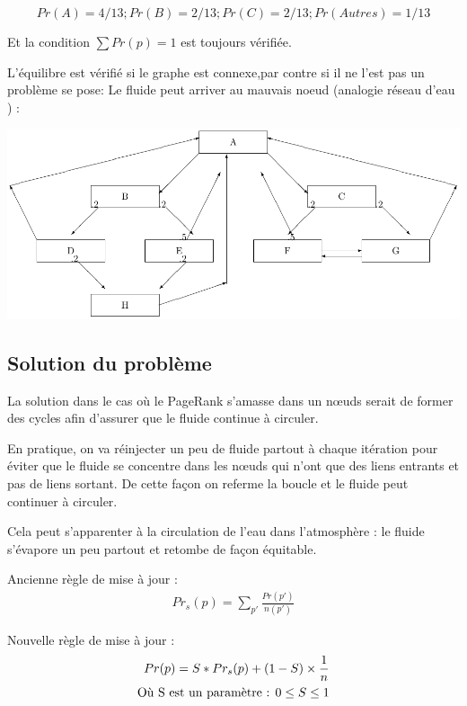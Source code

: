 	$$Pr(A) = 4/13 ; Pr(B) = 2/13 ; Pr(C) = 2/13 ; Pr(Autres) = 1/13$$
 
Et la condition $\sum Pr(p) = 1$ est toujours vérifiée.
 
 L'équilibre est vérifié si le graphe est connexe,par contre si il ne l'est pas un problème se pose: Le fluide peut arriver au mauvais noeud (analogie réseau d'eau )  :

\includegraphics[scale=0.8]{images/24_Nconnexe.pdf}

\subsection*{Solution du problème}
	La solution dans le cas où le PageRank s'amasse dans un nœuds serait de former des cycles afin d'assurer que le fluide continue à circuler.
	
 	En pratique, on va réinjecter un peu de fluide partout à chaque itération pour éviter que le fluide se concentre dans les nœuds qui n'ont que des liens entrants et pas de liens sortant. De cette façon on referme la boucle et le fluide peut continuer à circuler.
 	
 	Cela peut s'apparenter à la circulation de l'eau dans l'atmosphère : le fluide s'évapore un peu partout et retombe de façon équitable.

	Ancienne règle de mise à jour :
	\begin{align*}
	Pr_s(p) =  \sum_ {p'}\frac{Pr(p')}{n(p')}
	\end{align*}
	
 	Nouvelle règle de mise à jour : \\
	\begin{align*}
         Pr(p) = S*Pr_s(p) + (1-S)  \times \frac{1}{n} \\
	 \text{Où S est un paramètre : $ 0 \le S \le 1 $} %
	\end{align*}
        
